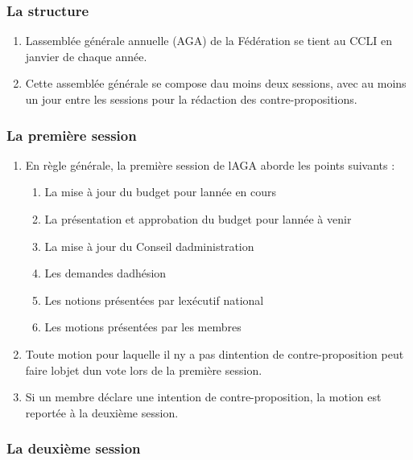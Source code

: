 \subsubsection{La structure}
\label{la-structure}

\begin{enumerate}
 \item
  L\textquotesingle assemblée générale annuelle (AGA) de la Fédération se tient au CCLI en janvier de chaque année.
 \item
  Cette assemblée générale se compose d\textquotesingle au moins deux sessions, avec au moins un jour entre les sessions pour la rédaction des contre-propositions.
\end{enumerate}

\subsubsection{La première session}
\label{la-premiere-session}

\begin{enumerate}
 \item
  En règle générale, la première session de l\textquotesingle AGA aborde les points suivants :

  \begin{enumerate}
   \item
    La mise à jour du budget pour l\textquotesingle année en cours
   \item
    La présentation et approbation du budget pour l\textquotesingle année à venir
   \item
    La mise à jour du Conseil d\textquotesingle administration
   \item
    Les demandes d\textquotesingle adhésion
   \item
    Les notions présentées par l\textquotesingle exécutif national
   \item
    Les motions présentées par les membres
  \end{enumerate}
 \item
  Toute motion pour laquelle il n\textquotesingle y a pas d\textquotesingle intention de contre-proposition peut faire l\textquotesingle objet d\textquotesingle un vote lors de la première session.
 \item
  Si un membre déclare une intention de contre-proposition, la motion est reportée à la deuxième session.
\end{enumerate}

\subsubsection{La deuxième session}
\label{la-deuxieme-session}

